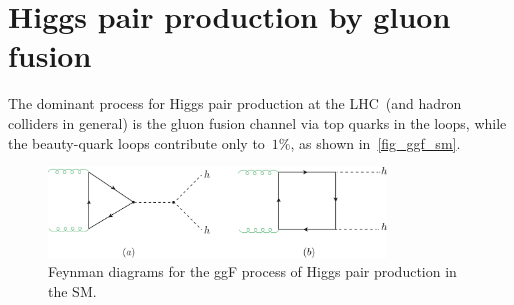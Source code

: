 \section{Higgs pair production by gluon fusion \label{ggFhh}  }
The dominant process for Higgs pair production at the LHC~(and hadron colliders in general) is the gluon fusion channel via top quarks in the loops, while the beauty-quark loops contribute only to~$1\%$, as shown in~\autoref{fig_ggf_sm}.
%
\begin{figure}[!htpb]
	\centering
	\includegraphics[width = 0.8\textwidth]{./figures/di-higgs-LO-SM}
	\caption{Feynman diagrams for the ggF process of Higgs pair production in the SM.} 
	\label{fig_ggf_sm}
\end{figure}
%
